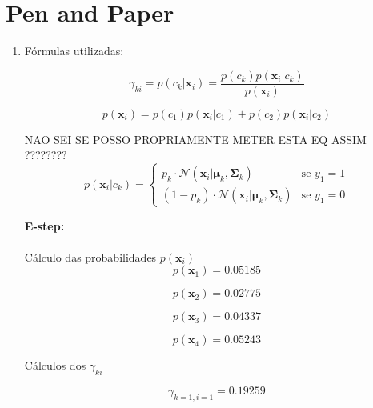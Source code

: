 \documentclass[a4paper,12pt]{article} %
\begin{document}
\section*{Pen and Paper}
\begin{enumerate}

\item Fórmulas utilizadas:

\begin{equation}
    \gamma_{ki} = p(c_k|\mathbf{x}_i) = \frac{p(c_k)p(\mathbf{x}_i|c_k)}{p(\mathbf{x}_i)}
\end{equation}

\begin{equation}
    p(\mathbf{x}_i) = p(c_1)p(\mathbf{x}_i|c_1)+p(c_2)p(\mathbf{x}_i|c_2)
\end{equation}

NAO SEI SE POSSO PROPRIAMENTE METER ESTA EQ ASSIM ????????
\begin{equation}
    p(\mathbf{x}_i|c_k) =
    \begin{cases} 
        p_{k} \cdot \mathcal{N}(\mathbf{x}_i|\boldsymbol{\mu}_k,\boldsymbol{\Sigma}_k) & \text{se } y_1 = 1 \\
        (1-p_k) \cdot \mathcal{N}(\mathbf{x}_i|\boldsymbol{\mu}_k,\boldsymbol{\Sigma}_k) & \text{se } y_1 = 0 
    \end{cases}
\end{equation}

\textbf{E-step:} \\ \\

Cálculo das probabilidades $p(\textbf{x}_i)$
\begin{equation*}
    p(\textbf{x}_1) = 0.05185
\end{equation*}

\begin{equation*}
    p(\textbf{x}_2) = 0.02775
\end{equation*}

\begin{equation*}
    p(\textbf{x}_3) = 0.04337
\end{equation*}

\begin{equation*}
    p(\textbf{x}_4) = 0.05243
\end{equation*}

Cálculos dos $\gamma_{ki}$

\begin{equation*}
    \gamma_{k=1,i=1} = 0.19259
\end{equation*}


\end{enumerate}
\end{document}
